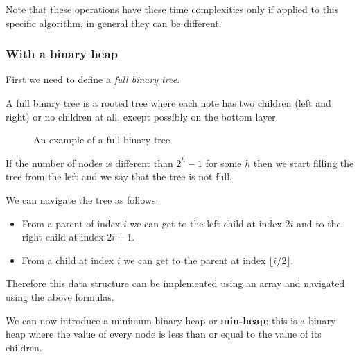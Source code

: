 \documentclass[12pt]{extarticle}
\begin{document}
Note that these operations have these time complexities only if applied to this specific algorithm, in general they can be different.

\subsubsection{With a binary heap}

First we need to define a \textit{full binary tree}.

A full binary tree is a rooted tree where each note has two children (left and right) or no children at all, except possibly on the bottom layer.

\begin{figure}[H]
    \centering
    \caption{An example of a full binary tree} \label{fig:fullbinarytree}
\end{figure}

If the number of nodes is different than $2^h - 1$ for some $h$ then we start filling the tree from the left and we say that the tree is not full.

We can navigate the tree as follows:

\begin{itemize}
    \item From a parent of index $i$ we can get to the left child at index $2i$ and to the right child at index $2i + 1$.
    \item From a child at index $i$ we can get to the parent at index $\lfloor i / 2 \rfloor$.
\end{itemize}

Therefore this data structure can be implemented using an array and navigated using the above formulas.

We can now introduce a minimum binary heap or \textbf{min-heap}:
this is a binary heap where the value of every node is less than or equal to the value of its children.
\end{document}
